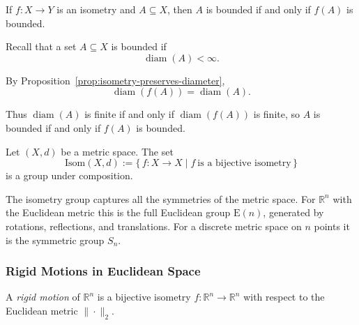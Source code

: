 \begin{proposition}
\label{prop:isometry-preserves-bounded}
If $f : X \to Y$ is an isometry and $A \subseteq X$, then $A$ is bounded
if and only if $f(A)$ is bounded.
\end{proposition}

\begin{remark*}
Recall that a set $A \subseteq X$ is bounded if
\[
\operatorname{diam}(A) < \infty.
\]

By Proposition~\ref{prop:isometry-preserves-diameter},
\[
\operatorname{diam}(f(A)) = \operatorname{diam}(A).
\]

Thus $\operatorname{diam}(A)$ is finite if and only if
$\operatorname{diam}(f(A))$ is finite, so $A$ is bounded
if and only if $f(A)$ is bounded.
\end{remark*}



\begin{proposition}
\label{prop:isometry-group}
Let $(X,d)$ be a metric space.
The set
\[
\mathrm{Isom}(X,d)
:= \{\, f : X \to X \mid f\ \text{is a bijective isometry}\,\}
\]
is a group under composition.
\end{proposition}

\begin{remark*}[Intuition]
The isometry group captures all the symmetries of the metric space.
For $\mathbb{R}^n$ with the Euclidean metric this is the full Euclidean
group $\mathrm{E}(n)$, generated by rotations, reflections, and translations.
For a discrete metric space on $n$ points it is the symmetric group $S_n$.
\end{remark*}

\subsubsection{Rigid Motions in Euclidean Space}
\label{sec:rigid-motions}

\begin{tcolorbox}[colback=propbox, colframe=propborder, arc=2pt,
  left=6pt, right=6pt, top=4pt, bottom=4pt,
  title={\small\textbf{Definition (Rigid Motion)}},
  fonttitle=\small\bfseries]
\begin{definition}
\label{def:rigid-motion}
A \emph{rigid motion} of $\mathbb{R}^n$ is a bijective isometry
$f : \mathbb{R}^n \to \mathbb{R}^n$
with respect to the Euclidean metric $\|\cdot\|_2$.
\end{definition}
\end{tcolorbox}

